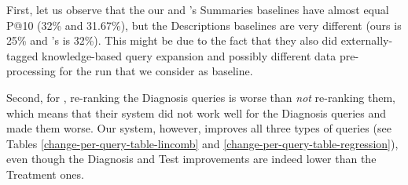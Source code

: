 \begin{table}[h!]
\centering
\caption{Comparison with previous research --- 2014}
\label{choi-comp}
\end{table}

First, let us observe that the our and \cite{choi}'s Summaries baselines have almost equal P@10 (32\% and 31.67\%),
but the Descriptions baselines are very different (ours is 25\% and \cite{choi}'s is 32\%).
This might be due to the fact that they also did externally-tagged knowledge-based query expansion
and possibly different data pre-processing for the
run that we consider as baseline.

Second, for \cite{choi}, re-ranking the Diagnosis queries is worse than \emph{not} re-ranking them, which means that
their system did not work well for the Diagnosis queries and made them worse.
Our system, however, improves all three types of queries 
(see Tables \ref{change-per-query-table-lincomb} and \ref{change-per-query-table-regression}),
even though the Diagnosis and Test improvements are indeed lower than the Treatment ones.

